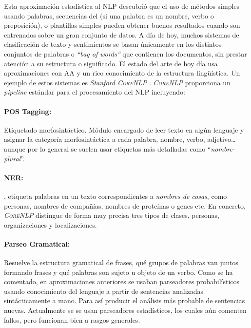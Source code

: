 Esta aproximación estadística al \ac{NLP} descubrió que el uso de métodos
simples usando palabras, secuencias del
 (si una palabra es un nombre, verbo o preposición), o plantillas
simples pueden obtener buenos resultados cuando son entrenados sobre un gran
conjunto de datos. A día de hoy, muchos sistemas de clasificación de texto y
sentimientos se basan únicamente en los distintos conjuntos de palabras o
\emph{``bag of words''} que contienen los documentos, sin prestar atención a su
estructura o significado. El estado del arte de hoy día usa aproximaciones con
\ac{AA} y un rico conocimiento de la estructura lingüística. Un ejemplo de estos
sistemas es \emph{Stanford \textsc{CoreNLP}} \citep{Manning2014}. \emph{\textsc{CoreNLP}}
proporciona un \emph{pipeline} estándar para el procesamiento del \ac{NLP}
incluyendo:

\paragraph{POS Tagging:}Etiquetado morfosintáctico. Módulo encargado de leer
texto en algún lenguaje y asignar la categoría morfosintáctica a cada palabra,
\eg nombre, verbo, adjetivo\dots aunque por lo general se suelen usar etiquetas
más detalladas como ``\emph{nombre-plural}''.

\paragraph{NER:}, etiqueta palabras en un texto
correspondientes a \emph{nombres de cosas}, como personas, nombres de compañías,
nombres de proteínas o genes etc. En concreto, \emph{\textsc{CoreNLP}} distingue de forma
muy precisa tres tipos de clases, personas, organizaciones y localizaciones.

\paragraph{Parseo Gramatical:}Resuelve la estructura gramatical de frases, \eg
qué grupos de palabras van juntos formando frases y qué palabras son sujeto u
objeto de un verbo. Como se ha comentado, en aproximaciones anteriores se usaban
parseadores probabilísticos usando conocimiento del lenguaje a partir de
sentencias analizadas sintácticamente a mano. Para así producir el análisis más
probable de sentencias nuevas. Actualmente se se usan parseadores estadísticos,
los cuales aún comenten fallos, pero funcionan bien a rasgos generales.

